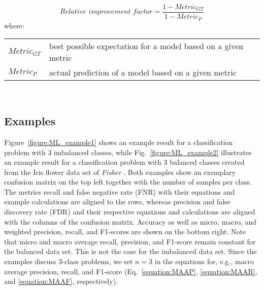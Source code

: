 \documentclass{article}
\makeatletter
\newenvironment{conditions}[1][where:]
    {\hspace{0.02\textwidth} #1 \begin{tabular}[t]{>{$}l<{$} @{${}={}$} l}}
    {\end{tabular}\\[\belowdisplayskip]}
\makeatother
\begin{document}
\begin{equation}
    \textit{Relative improvement factor} = \dfrac{1 - \textit{Metric}_\textit{GT}}{1 - \textit{Metric}_P}
%
    \label{equation:relative_improvement_factor}
\end{equation}
%
\begin{conditions}
    \textit{Metric}_\textit{GT} & best possible expectation for a model based on a given metric \\
    \textit{Metric}_P           & actual prediction of a model based on a given metric
\end{conditions}




\clearpage




\subsection{Examples}

Figure~\ref{figure:ML_example1} shows an example result for a classification problem with 3 imbalanced classes, while Fig.~\ref{figure:ML_example2} illustrates an example result for a classification problem with 3 balanced classes created from the Iris flower data set of \textit{Fisher} \cite{fisher1936use}. Both examples show an exemplary confusion matrix on the top left together with the number of samples per class. The metrics recall and false negative rate (FNR) with their equations and example calculations are aligned to the rows, whereas precision and false discovery rate (FDR) and their respective equations and calculations are aligned with the columns of the confusion matrix. Accuracy as well as micro, macro, and weighted precision, recall, and F1-scores are shown on the bottom right. Note that micro and macro average recall, precision, and F1-score remain constant for the balanced data set. This is not the case for the imbalanced data set. Since the examples discuss 3-class problems, we set $n = 3$ in the equations for, e.g., macro average precision, recall, and F1-score (Eq.~\ref{equation:MAAP}, \ref{equation:MAAR}, and \ref{equation:MAAF}, respectively).
\end{document}
